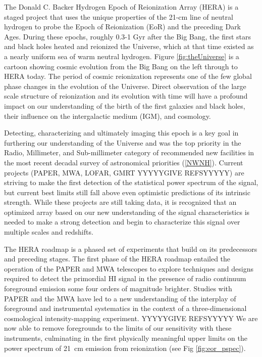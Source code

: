 \documentclass[ars]{copernicus}
\begin{document}
\introduction  %
\label{sec:intro}
The Donald C. Backer Hydrogen Epoch of Reionization Array (HERA) is a staged project
that uses the unique properties of the 21-cm line of neutral hydrogen to probe the
Epoch of Reionization (EoR) and the preceding Dark Ages. During these epochs, roughly
0.3-1 Gyr after the Big Bang, the first stars and black holes heated and reionized
the Universe, which at that time existed as a nearly uniform sea of warm neutral
hydrogen.  Figure \ref{fig:theUniverse} is a cartoon showing cosmic evolution from the Big Bang on the left through
to HERA today. The period of cosmic reionization represents one of the few global
phase changes in the evolution of the Universe.
Direct observation of the large scale structure of reionization and its
evolution with time will have a profound impact on our understanding of the birth of
the first galaxies and black holes, their influence on the intergalactic medium
(IGM), and cosmology.

Detecting, characterizing and ultimately imaging this epoch is a key goal in
furthering our understanding of the Universe and was the top priority in the Radio,
Millimeter, and Sub-millimeter category of recommended new facilities in the most
recent decadal survey of astronomical priorities (\ref{NWNH}). Current projects
(PAPER, MWA, LOFAR, GMRT YYYYYGIVE REFSYYYYY) are striving to make the first detection of the statistical
power spectrum of the signal, but current best limits still fall above even
optimistic predictions of its intrinsic strength. While these projects are still
taking data, it is recognized that an optimized array based on our new understanding
of the signal characteristics is needed to make a strong detection and begin to
characterize this signal over multiple scales and redshifts.

The HERA roadmap is a phased set of experiments that build on its predecessors and preceding stages.
The first phase of the HERA roadmap entailed the operation of the
PAPER and MWA telescopes to explore techniques and designs required to
detect the primordial HI signal in the presence of radio continuum
foreground emission some four orders of magnitude brighter. Studies
with PAPER and the MWA have led to a new understanding of the
interplay of foreground and instrumental systematics in the context of
a three-dimensional cosmological intensity-mapping experiment.  YYYYYGIVE REFSYYYYY 
We are
now able to remove foregrounds to the limits of our sensitivity with
these instruments, culminating in the first physically meaningful
upper limits on the power spectrum of 21~cm emission from
reionization (see Fig \ref{fig:eor_pspec}).
\end{document}
